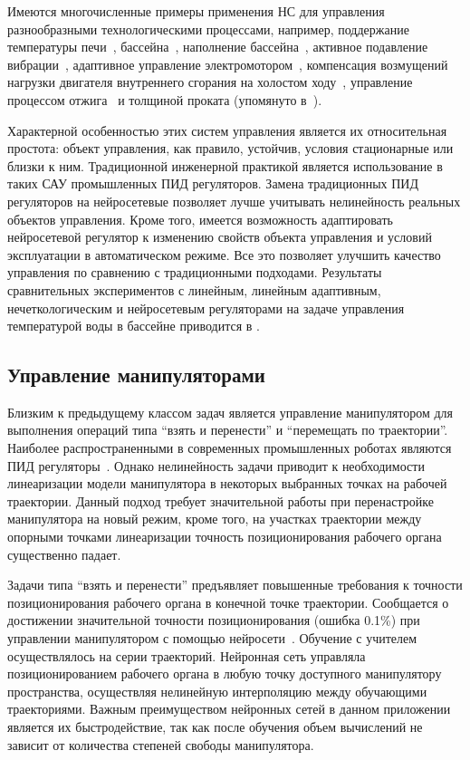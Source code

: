 Имеются многочисленные примеры применения НС для управления
разнообразными технологическими процессами, например, поддержание
температуры печи~\cite{sigom00}, бассейна~\cite{khomyu96}, наполнение
бассейна~\cite{kav96}, активное подавление вибрации~\cite{bouchard01},
адаптивное управление электромотором~\cite{linwaihong01}, компенсация
возмущений нагрузки двигателя внутреннего сгорания на холостом
ходу~\cite{gorfeld96,tukin01}, управление процессом
отжига~\cite{pican95} и толщиной проката (упомянуто
в~\cite{bondlog97}).

Характерной особенностью этих систем управления является их
относительная простота: объект управления, как правило, устойчив,
условия стационарные или близки к ним.  Традиционной инженерной
практикой является использование в таких САУ промышленных ПИД
регуляторов.  Замена традиционных ПИД регуляторов на нейросетевые
позволяет лучше учитывать нелинейность реальных объектов управления.
Кроме того, имеется возможность адаптировать нейросетевой регулятор к
изменению свойств объекта управления и условий эксплуатации в
автоматическом режиме.  Все это позволяет улучшить качество управления
по сравнению с традиционными подходами.  Результаты сравнительных
экспериментов с линейным, линейным адаптивным, нечеткологическим и
нейросетевым регуляторами на задаче управления температурой воды в
бассейне приводится в \cite{khomyu96}.

\subsection{Управление манипуляторами}

Близким к предыдущему классом задач является управление манипулятором
для выполнения операций типа ``взять и перенести'' и ``перемещать по
траектории''.  Наиболее распространенными в современных промышленных
роботах являются ПИД регуляторы~\cite{chenmills97}.  Однако
нелинейность задачи приводит к необходимости линеаризации модели
манипулятора в некоторых выбранных точках на рабочей траектории.
Данный подход требует значительной работы при перенастройке
манипулятора на новый режим, кроме того, на участках траектории между
опорными точками линеаризации точность позиционирования рабочего
органа существенно падает.

Задачи типа ``взять и перенести'' предъявляет повышенные требования к
точности позиционирования рабочего органа в конечной точке траектории.
Сообщается о достижении значительной точности позиционирования (ошибка
0.1\%) при управлении манипулятором с помощью
нейросети~\cite{bondlog97}.  Обучение с учителем осуществлялось на
серии траекторий.  Нейронная сеть управляла позиционированием рабочего
органа в любую точку доступного манипулятору пространства, осуществляя
нелинейную интерполяцию между обучающими траекториями.  Важным
преимуществом нейронных сетей в данном приложении является их
быстродействие, так как после обучения объем вычислений не зависит от
количества степеней свободы манипулятора.

